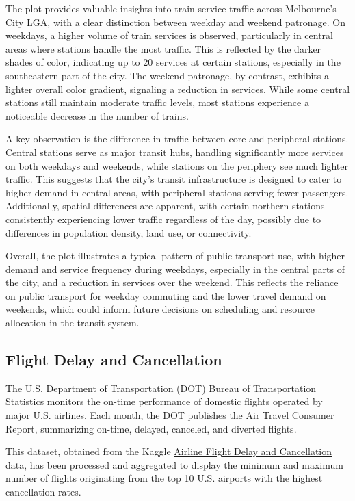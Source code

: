 The plot provides valuable insights into train service traffic across Melbourne's City LGA, with a clear distinction between weekday and weekend patronage. On weekdays, a higher volume of train services is observed, particularly in central areas where stations handle the most traffic. This is reflected by the darker shades of color, indicating up to 20 services at certain stations, especially in the southeastern part of the city. The weekend patronage, by contrast, exhibits a lighter overall color gradient, signaling a reduction in services. While some central stations still maintain moderate traffic levels, most stations experience a noticeable decrease in the number of trains.

A key observation is the difference in traffic between core and peripheral stations. Central stations serve as major transit hubs, handling significantly more services on both weekdays and weekends, while stations on the periphery see much lighter traffic. This suggests that the city's transit infrastructure is designed to cater to higher demand in central areas, with peripheral stations serving fewer passengers. Additionally, spatial differences are apparent, with certain northern stations consistently experiencing lower traffic regardless of the day, possibly due to differences in population density, land use, or connectivity.

Overall, the plot illustrates a typical pattern of public transport use, with higher demand and service frequency during weekdays, especially in the central parts of the city, and a reduction in services over the weekend. This reflects the reliance on public transport for weekday commuting and the lower travel demand on weekends, which could inform future decisions on scheduling and resource allocation in the transit system.

\subsection{Flight Delay and Cancellation}\label{flight-delay-and-cancellation}

The U.S. Department of Transportation (DOT) Bureau of Transportation Statistics monitors the on-time performance of domestic flights operated by major U.S. airlines. Each month, the DOT publishes the Air Travel Consumer Report, summarizing on-time, delayed, canceled, and diverted flights.

This dataset, obtained from the Kaggle \href{https://www.kaggle.com/datasets/patrickzel/flight-delay-and-cancellation-dataset-2019-2023}{Airline Flight Delay and Cancellation data}, has been processed and aggregated to display the minimum and maximum number of flights originating from the top 10 U.S. airports with the highest cancellation rates.

